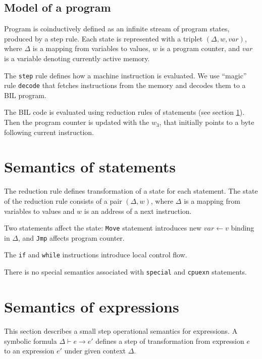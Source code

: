\documentclass[11pt]{article}
\begin{document}
\subsection{Model of a program}

Program is coinductively defined as an infinite stream of program
states, produced by a step rule. Each state is represented with a
triplet $(\Delta, w, var)$, where $\Delta$ is a mapping from variables
to values, $w$ is a program counter, and $var$ is a variable
denoting currently active memory.

The \verb|step| rule defines how a machine instruction is
evaluated. We use ``magic'' rule \verb|decode| that fetches
instructions from the memory and decodes them to a BIL program.

The BIL code is evaluated using reduction rules of statements (see
section \ref{sec:sema:stmt}). Then the program counter is updated with
the $w_3$, that initially points to a byte following current instruction.

\ottdefnsprogram

\section{Semantics of statements}
\label{sec:sema:stmt}

The reduction rule defines transformation of a state for each
statement. The state of the reduction rule consists of a pair
$(\Delta,w)$, where $\Delta$ is a mapping from variables to values and
$w$ is an address of a next instruction.

Two statements affect the state: \verb|Move| statement introduces new
$var \leftarrow v$ binding in $\Delta$, and \verb|Jmp| affects
program counter.

The \verb|if| and \verb|while| instructions introduce local control
flow.

There is no special semantics associated with \verb|special| and
\verb|cpuexn| statements.

\ottdefnsreduceXXstmt


\section {Semantics of expressions}
\label{sec:sema:exp}

This section describes a small step operational semantics for
expressions. A symbolic formula $\Delta \vdash e \rightarrow e' $
defines a step of transformation from expression $e$ to an expression
$e'$ under given context $\Delta$.
\end{document}
